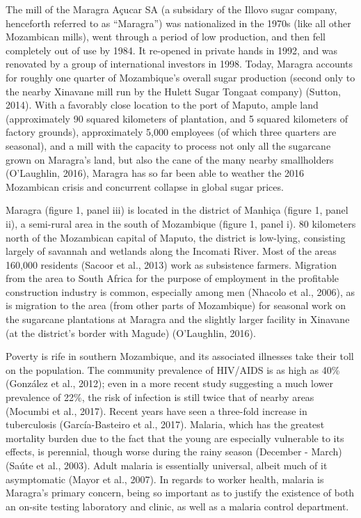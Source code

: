 \documentclass[]{article}
\begin{document}
The mill of the Maragra Açucar SA (a subsidary of the Illovo sugar
company, henceforth referred to as ``Maragra'') was nationalized in the
1970s (like all other Mozambican mills), went through a period of low
production, and then fell completely out of use by 1984. It re-opened in
private hands in 1992, and was renovated by a group of international
investors in 1998. Today, Maragra accounts for roughly one quarter of
Mozambique's overall sugar production (second only to the nearby
Xinavane mill run by the Hulett Sugar Tongaat company) (Sutton, 2014).
With a favorably close location to the port of Maputo, ample land
(approximately 90 squared kilometers of plantation, and 5 squared
kilometers of factory grounds), approximately 5,000 employees (of which
three quarters are seasonal), and a mill with the capacity to process
not only all the sugarcane grown on Maragra's land, but also the cane of
the many nearby smallholders (O'Laughlin, 2016), Maragra has so far been
able to weather the 2016 Mozambican crisis and concurrent collapse in
global sugar prices.

Maragra (figure 1, panel iii) is located in the district of Manhiça
(figure 1, panel ii), a semi-rural area in the south of Mozambique
(figure 1, panel i). 80 kilometers north of the Mozambican capital of
Maputo, the district is low-lying, consisting largely of savannah and
wetlands along the Incomati River. Most of the areas 160,000 residents
(Sacoor et al., 2013) work as subsistence farmers. Migration from the
area to South Africa for the purpose of employment in the profitable
construction industry is common, especially among men (Nhacolo et al.,
2006), as is migration to the area (from other parts of Mozambique) for
seasonal work on the sugarcane plantations at Maragra and the slightly
larger facility in Xinavane (at the district's border with Magude)
(O'Laughlin, 2016).

Poverty is rife in southern Mozambique, and its associated illnesses
take their toll on the population. The community prevalence of HIV/AIDS
is as high as 40\% (González et al., 2012); even in a more recent study
suggesting a much lower prevalence of 22\%, the risk of infection is
still twice that of nearby areas (Mocumbi et al., 2017). Recent years
have seen a three-fold increase in tuberculosis (García-Basteiro et al.,
2017). Malaria, which has the greatest mortality burden due to the fact
that the young are especially vulnerable to its effects, is perennial,
though worse during the rainy season (December - March) (Saúte et al.,
2003). Adult malaria is essentially universal, albeit much of it
asymptomatic (Mayor et al., 2007). In regards to worker health, malaria
is Maragra's primary concern, being so important as to justify the
existence of both an on-site testing laboratory and clinic, as well as a
malaria control department.
\end{document}
